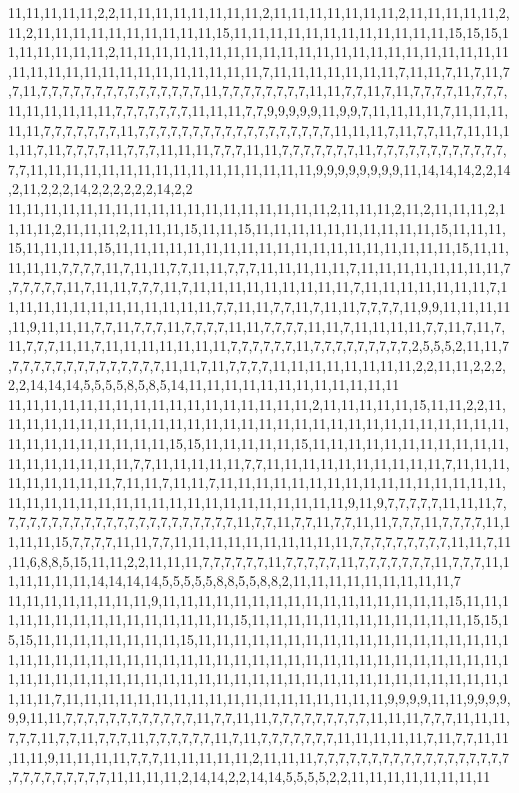 11,11,11,11,11,2,2,11,11,11,11,11,11,11,11,2,11,11,11,11,11,11,11,2,11,11,11,11,11,2,11,2,11,11,11,11,11,11,11,11,11,11,15,11,11,11,11,11,11,11,11,11,11,11,11,15,15,15,11,11,11,11,11,11,2,11,11,11,11,11,11,11,11,11,11,11,11,11,11,11,11,11,11,11,11,11,11,11,11,11,11,11,11,11,11,11,11,11,11,11,11,7,11,11,11,11,11,11,11,7,11,11,7,11,7,11,7,7,11,7,7,7,7,7,7,7,7,7,7,7,7,7,7,7,11,7,7,7,7,7,7,7,7,11,11,7,7,11,7,11,7,7,7,7,11,7,7,7,11,11,11,11,11,11,7,7,7,7,7,7,7,11,11,11,7,7,9,9,9,9,9,11,9,9,7,11,11,11,11,7,11,11,11,11,11,7,7,7,7,7,7,7,11,7,7,7,7,7,7,7,7,7,7,7,7,7,7,7,7,7,7,11,11,11,7,11,7,7,11,7,11,11,11,11,7,11,7,7,7,7,11,7,7,7,11,11,11,7,7,7,11,11,7,7,7,7,7,7,7,11,7,7,7,7,7,7,7,7,7,7,7,7,7,7,11,11,11,11,11,11,11,11,11,11,11,11,11,11,11,11,9,9,9,9,9,9,9,9,11,14,14,14,2,2,14,2,11,2,2,2,14,2,2,2,2,2,2,14,2,2
11,11,11,11,11,11,11,11,11,11,11,11,11,11,11,11,11,11,2,11,11,11,2,11,2,11,11,11,2,11,11,11,2,11,11,11,2,11,11,11,15,11,11,15,11,11,11,11,11,11,11,11,11,11,15,11,11,11,15,11,11,11,11,15,11,11,11,11,11,11,11,11,11,11,11,11,11,11,11,11,11,11,11,15,11,11,11,11,11,7,7,7,7,11,7,11,11,7,7,11,11,7,7,7,11,11,11,11,11,7,11,11,11,11,11,11,11,11,7,7,7,7,7,7,11,7,11,11,7,7,7,11,7,11,11,11,11,11,11,11,11,11,7,11,11,11,11,11,11,11,7,11,11,11,11,11,11,11,11,11,11,11,11,7,7,11,11,7,7,11,7,11,11,7,7,7,7,11,9,9,11,11,11,11,11,9,11,11,11,7,7,11,7,7,7,11,7,7,7,7,11,11,7,7,7,7,11,11,7,11,11,11,11,7,7,11,7,11,7,11,7,7,7,11,11,7,11,11,11,11,11,11,11,7,7,7,7,7,7,11,7,7,7,7,7,7,7,7,7,2,5,5,5,2,11,11,7,7,7,7,7,7,7,7,7,7,7,7,7,7,7,11,11,7,11,7,7,7,7,11,11,11,11,11,11,11,11,2,2,11,11,2,2,2,2,2,14,14,14,5,5,5,5,8,5,8,5,14,11,11,11,11,11,11,11,11,11,11,11,11
11,11,11,11,11,11,11,11,11,11,11,11,11,11,11,11,11,2,11,11,11,11,11,15,11,11,2,2,11,11,11,11,11,11,11,11,11,11,11,11,11,11,11,11,11,11,11,11,11,11,11,11,11,11,11,11,11,11,11,11,11,11,11,11,11,11,15,15,11,11,11,11,11,15,11,11,11,11,11,11,11,11,11,11,11,11,11,11,11,11,11,11,7,7,11,11,11,11,11,7,7,11,11,11,11,11,11,11,11,11,11,7,11,11,11,11,11,11,11,11,11,7,11,11,7,11,11,7,11,11,11,11,11,11,11,11,11,11,11,11,11,11,11,11,11,11,11,11,11,11,11,11,11,11,11,11,11,11,11,11,11,11,11,9,11,9,7,7,7,7,7,11,11,11,7,7,7,7,7,7,7,7,7,7,7,7,7,7,7,7,7,7,7,7,7,7,11,7,7,11,7,7,11,7,7,11,11,7,7,7,11,7,7,7,7,11,11,11,11,15,7,7,7,7,11,11,7,7,11,11,11,11,11,11,11,11,11,11,7,7,7,7,7,7,7,7,7,11,11,7,11,11,6,8,8,5,15,11,11,2,2,11,11,11,7,7,7,7,7,7,11,7,7,7,7,7,11,7,7,7,7,7,7,7,11,7,7,7,11,11,11,11,11,11,14,14,14,14,5,5,5,5,5,8,8,5,5,8,8,2,11,11,11,11,11,11,11,11,11,7
11,11,11,11,11,11,11,11,9,11,11,11,11,11,11,11,11,11,11,11,11,11,11,11,11,15,11,11,11,11,11,11,11,11,11,11,11,11,11,11,11,15,11,11,11,11,11,11,11,11,11,11,11,11,15,15,15,15,11,11,11,11,11,11,11,11,15,11,11,11,11,11,11,11,11,11,11,11,11,11,11,11,11,11,11,11,11,11,11,11,11,11,11,11,11,11,11,11,11,11,11,11,11,11,11,11,11,11,11,11,11,11,11,11,11,11,11,11,11,11,11,11,11,11,11,11,11,11,11,11,11,11,11,11,11,11,11,11,11,11,11,11,11,7,11,11,11,11,11,11,11,11,11,11,11,11,11,11,11,11,11,11,9,9,9,9,11,11,9,9,9,9,9,9,11,11,7,7,7,7,7,7,7,7,7,7,7,7,11,7,7,11,11,7,7,7,7,7,7,7,7,7,11,11,11,7,7,7,11,11,11,7,7,7,11,7,7,11,7,7,7,11,7,7,7,7,7,7,11,7,11,7,7,7,7,7,7,7,11,11,11,11,11,7,11,7,7,11,11,11,11,9,11,11,11,11,7,7,7,11,11,11,11,11,2,11,11,11,7,7,7,7,7,7,7,7,7,7,7,7,7,7,7,7,7,7,7,7,7,7,7,7,7,7,7,11,11,11,11,2,14,14,2,2,14,14,5,5,5,5,2,2,11,11,11,11,11,11,11,11
